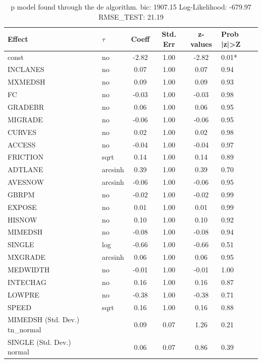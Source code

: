 \begin{table}
	\caption{p model found through the de algorithm. bic: 1907.15 Log-Likelihood: -679.97 RMSE_TEST: 21.19}
	\begin{center}
		\begin{tabular}{|l|l|c|c|c|l|}
			\hline
			Effect & $\tau$ & Coeff & Std. Err & z-values & Prob |z|>Z \\
			\hline
			const & no & -2.82 & 1.00 & -2.82 & 0.01* \\
			\hline
			INCLANES & no & 0.07 & 1.00 & 0.07 & 0.94 \\
			\hline
			MXMEDSH & no & 0.09 & 1.00 & 0.09 & 0.93 \\
			\hline
			FC & no & -0.03 & 1.00 & -0.03 & 0.98 \\
			\hline
			GRADEBR & no & 0.06 & 1.00 & 0.06 & 0.95 \\
			\hline
			MIGRADE & no & -0.06 & 1.00 & -0.06 & 0.95 \\
			\hline
			CURVES & no & 0.02 & 1.00 & 0.02 & 0.98 \\
			\hline
			ACCESS & no & -0.04 & 1.00 & -0.04 & 0.97 \\
			\hline
			FRICTION & sqrt & 0.14 & 1.00 & 0.14 & 0.89 \\
			\hline
			ADTLANE & arcsinh & 0.39 & 1.00 & 0.39 & 0.70 \\
			\hline
			AVESNOW & arcsinh & -0.06 & 1.00 & -0.06 & 0.95 \\
			\hline
			GBRPM & no & -0.02 & 1.00 & -0.02 & 0.99 \\
			\hline
			EXPOSE & no & 0.01 & 1.00 & 0.01 & 0.99 \\
			\hline
			HISNOW & no & 0.10 & 1.00 & 0.10 & 0.92 \\
			\hline
			MIMEDSH & no & -0.08 & 1.00 & -0.08 & 0.94 \\
			\hline
			SINGLE & log & -0.66 & 1.00 & -0.66 & 0.51 \\
			\hline
			MXGRADE & arcsinh & 0.06 & 1.00 & 0.06 & 0.95 \\
			\hline
			MEDWIDTH & no & -0.01 & 1.00 & -0.01 & 1.00 \\
			\hline
			INTECHAG & no & 0.16 & 1.00 & 0.16 & 0.87 \\
			\hline
			LOWPRE & no & -0.38 & 1.00 & -0.38 & 0.71 \\
			\hline
			SPEED & sqrt & 0.16 & 1.00 & 0.16 & 0.88 \\
			\hline
			MIMEDSH (Std. Dev.) tn_normal &  & 0.09 & 0.07 & 1.26 & 0.21 \\
			\hline
			SINGLE (Std. Dev.) normal &  & 0.06 & 0.07 & 0.86 & 0.39 \\

\end{tabular}
\end{center}
\end{table}
